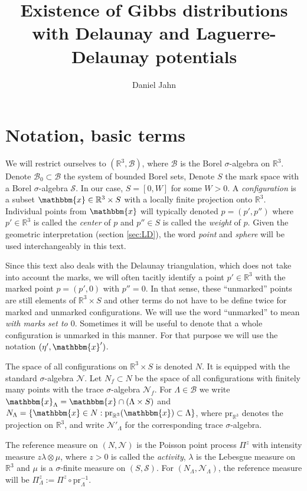 \documentclass[12pt,a4paper]{article}
\title{Existence of Gibbs distributions with Delaunay and Laguerre-Delaunay potentials}
\author{Daniel Jahn}
\newcommand{\R}{{\mathbb R^3}}
\theoremstyle{definition}
\theoremstyle{remark}
\theoremstyle{theorem}
\newcommand{\x}{\mathbbm{x}}
\begin{document}
\maketitle
\tableofcontents

\section{Notation, basic terms}

We will restrict ourselves to $(\mathbb R^3, \mathcal B)$, where $\mathcal B$ is the Borel $\sigma$-algebra on $\R$. Denote $\mathcal B_0 \subset \mathcal B$ the system of bounded Borel sets, Denote $S$ the mark space with a Borel $\sigma$-algebra $\mathcal S$. In our case, $S = [0,W]$ for some $W>0$. A \textit{configuration} is a subset $\x \in \mathbb R^3\times S$ with a locally finite projection onto $\mathbb R^3$. Individual points from $\x$ will typically denoted $p=(p',p'')$ where $p' \in \mathbb R^3$ is called the \textit{center} of $p$ and $p'' \in S$ is called the \textit{weight} of $p$. Given the geometric interpretation (section \ref{sec:LD}),  the word \textit{point} and \textit{sphere} will be used interchangeably in this text.

Since this text also deals with the Delaunay triangulation, which does not take into account the marks, we will often tacitly identify a point $p'\in\R$ with the marked point $p=(p',0)$ with $p''=0$. In that sense, these ``unmarked'' points are still elements of $\R\times S$ and other terms do not have to be define twice for marked and unmarked configurations. We will use the word ``unmarked'' to mean \textit{with marks set to $0$}.  Sometimes it will be useful to denote that a whole configuration is unmarked in this manner. For that purpose we will use the notation $(\eta', \x')$. 

The space of all configurations on $\mathbb R^3 \times S$ is denoted $N$. It is equipped with the standard $\sigma$-algebra $\mathcal N$. Let $N_f \subset N$ be the space of all configurations with finitely many points with the trace $\sigma$-algebra $\mathcal N_f$. For $\Lambda\in\mathcal B$ we write $\x_{\Lambda} = \x \cap (\Lambda \times S)$ and $N_\Lambda = \{\x \in N: \text{pr}_{\R} (\x) \subset \Lambda\}$, where $\text{pr}_\R$ denotes the projection on $\R$, and write $\mathcal N'_\Lambda$ for the corresponding trace $\sigma$-algebra.

The reference measure on $(N, \mathcal N)$ is the Poisson point process $\Pi^z$ with intensity measure $z\lambda \otimes \mu$, where $z>0$ is called the \textit{activity}, $\lambda$ is the Lebesgue measure on $\mathbb R^3$ and $\mu$ is a $\sigma$-finite measure on $(S,\mathcal S)$. For $(N_\Lambda, \mathcal N_\Lambda)$, the reference measure will be $\Pi^z_\Lambda := \Pi^z \circ \text{pr}^{-1}_\Lambda$.
\end{document}
